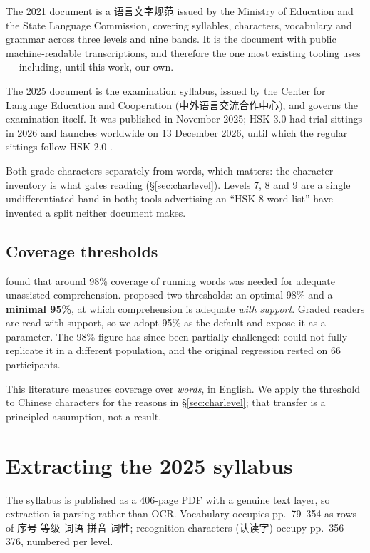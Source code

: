 \documentclass[11pt]{article}
\begin{document}
The 2021 document is a 语言文字规范 issued by the Ministry of Education and the
State Language Commission, covering syllables, characters, vocabulary and
grammar across three levels and nine bands. It is the document with public
machine-readable transcriptions, and therefore the one most existing tooling
uses --- including, until this work, our own.

The 2025 document is the examination syllabus, issued by the Center for
Language Education and Cooperation (中外语言交流合作中心), and governs the
examination itself. It was published in November 2025; HSK 3.0 had trial
sittings in 2026 and launches worldwide on 13 December 2026, until which the
regular sittings follow HSK 2.0 \citep{smec2026launch}.

Both grade characters separately from words, which matters: the character
inventory is what gates reading (\S\ref{sec:charlevel}). Levels 7, 8 and 9 are
a single undifferentiated band in both; tools advertising an ``HSK 8 word
list'' have invented a split neither document makes.

\subsection{Coverage thresholds}

\citet{hu2000unknown} found that around 98\% coverage of running words was
needed for adequate unassisted comprehension. \citet{laufer2010lexical}
proposed two thresholds: an optimal 98\% and a \textbf{minimal 95\%}, at which
comprehension is adequate \emph{with support}. Graded readers are read with
support, so we adopt 95\% as the default and expose it as a parameter. The 98\%
figure has since been partially challenged: \citet{kremmel2023replicating}
could not fully replicate it in a different population, and the original
regression rested on 66 participants.

This literature measures coverage over \emph{words}, in English. We apply the
threshold to Chinese characters for the reasons in \S\ref{sec:charlevel}; that
transfer is a principled assumption, not a result.

\section{Extracting the 2025 syllabus}
\label{sec:extract}

The syllabus is published as a 406-page PDF with a genuine text layer, so
extraction is parsing rather than OCR. Vocabulary occupies pp.~79--354 as rows
of 序号 等级 词语 拼音 词性; recognition characters (认读字) occupy
pp.~356--376, numbered per level.
\end{document}

